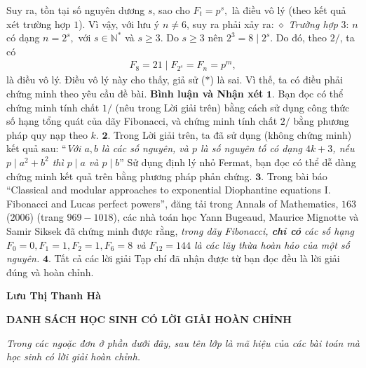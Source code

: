 \begin{multicols}{2}
	Suy ra, tồn tại số nguyên dương $s$, sao cho ${F_t} = {p^s},$ là điều vô lý (theo kết quả xét trường hợp $1$). Vì vậy, với lưu ý $n \ne 6$, suy ra phải xảy ra:
	\vskip 0.05cm
	$\diamond$ \textit{Trường hợp} $3$: $n$ có dạng $n = {2^s},$ với $s \in \mathbb{N^*}$ và $s \ge 3$.
	\vskip 0.05cm
	Do $s \ge 3$ nên  ${2^3} = 8\mid{2^s}$. Do đó, theo $2/$, ta có
	\begin{align*}
		{F_8} = 21\mid{F_{{2^s}}} = {F_n} = {p^m},
	\end{align*}
	là điều vô lý. Điều vô lý này cho thấy, giả sử ($*$) là sai. Vì thế, ta có điều phải chứng minh theo yêu cầu đề bài.
	\vskip 0.05cm
	\textbf{\color{thachthuctoanhoc}Bình luận và Nhận xét}
	\vskip 0.05cm
	$\pmb{1.}$ Bạn đọc có thể chứng minh tính chất $1/$ (nêu trong Lời giải trên) bằng cách sử dụng công thức số hạng tổng quát của dãy Fibonacci, và chứng minh tính chất $2/$ bằng phương pháp quy nạp theo $k$.
	\vskip 0.05cm
	$\pmb{2.}$ Trong Lời giải trên, ta đã sử dụng (không chứng minh) kết quả sau:
	\vskip 0.05cm
	“\textit{Với $a, b$ là các số nguyên, và $p$ là số nguyên tố có dạng $4k + 3$, nếu $p\mid{a^2} + {b^2}$  thì  $p \mid a$ và  $p \mid b$}”
	\vskip 0.05cm
	Sử dụng định lý nhỏ Fermat, bạn đọc có thể dễ dàng chứng minh kết quả trên bằng phương pháp phản chứng.
	\vskip 0.05cm
	$\pmb{3.}$ Trong bài báo “Classical and
	modular approaches to exponential Diophantine equations I. Fibonacci and Lucas perfect powers”, đăng tải trong Annals of Mathematics, $163$ ($2006$) (trang $969 - 1018$), các nhà toán học Yann Bugeaud, Maurice Mignotte và Samir Siksek đã chứng minh được rằng, \textit{trong dãy Fibonacci, \textbf{\color{thachthuctoanhoc}chỉ có} các số hạng $F_0=0, F_1 = 1, F_2 = 1, F_6 = 8$ và $F_{12} = 144$ là các lũy thừa hoàn hảo của một số nguyên.}
	\vskip 0.05cm
	$\pmb{4.}$ Tất cả các lời giải Tạp chí đã nhận được từ bạn đọc đều là lời giải đúng và hoàn chỉnh.
	\begin{flushright}
		\textbf{\color{thachthuctoanhoc}Lưu Thị Thanh Hà}
	\end{flushright}
\end{multicols}
\centerline{\textbf{\color{thachthuctoanhoc}DANH SÁCH HỌC SINH CÓ LỜI GIẢI HOÀN CHỈNH}}
\vskip 0.1cm
\textit{Trong các ngoặc đơn ở phần dưới đây, sau tên lớp là mã hiệu của các bài toán mà học sinh có lời giải hoàn chỉnh.}
